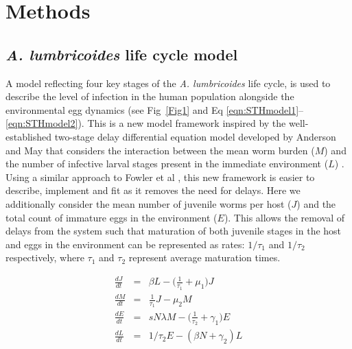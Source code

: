 \section{Methods}

\subsection{\textit{A. lumbricoides} life cycle model}

A model reflecting four key stages of the \textit{A. lumbricoides} life cycle, is used to describe the level of infection in the human population alongside the environmental egg dynamics (see Fig~\ref{Fig1} and Eq \ref{eqn:STHmodel1}--\ref{eqn:STHmodel2}). This is a new model framework inspired by the well-established two-stage delay differential equation model developed by Anderson and May that considers the interaction between the mean worm burden ($M$) and the number of infective larval stages present in the immediate environment ($L$) \cite{Anderson1992}. Using a similar approach to Fowler et al \cite{Fowler2016}, this new framework is easier to describe, implement and fit as it removes the need for delays. Here we additionally consider the mean number of juvenile worms per host ($J$) and the total count of immature eggs in the environment ($E$). This allows the removal of delays from the system such that maturation of both juvenile stages in the host and eggs in the environment can be represented as rates: $1/\tau_1$ and $1/\tau_2$ respectively, where $\tau_1$ and $\tau_2$ represent average maturation times.

\begin{eqnarray}
\label{eqn:STHmodel1}
\frac{dJ}{dt} &=& \beta L - \bigg(\frac{1}{\tau_1} + \mu_1\bigg)J\\
\frac{dM}{dt} &=& \frac{1}{\tau_1} J - \mu_2 M\\
\frac{dE}{dt} &=& sN\lambda M - \bigg(\frac{1}{\tau_2} + \gamma_1\bigg)E\\
\frac{dL}{dt} &=& 1/\tau_2 E - (\beta N+\gamma_2)L
\label{eqn:STHmodel2}
\end{eqnarray}

